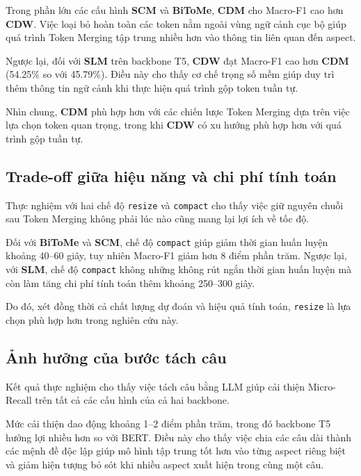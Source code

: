 Trong phần lớn các cấu hình \textbf{SCM} và \textbf{BiToMe},
\textbf{CDM} cho Macro-F1 cao hơn \textbf{CDW}.
Việc loại bỏ hoàn toàn các token nằm ngoài vùng ngữ cảnh cục bộ giúp
quá trình Token Merging tập trung nhiều hơn vào thông tin liên quan đến
aspect.

Ngược lại, đối với \textbf{SLM} trên backbone T5, \textbf{CDW} đạt
Macro-F1 cao hơn \textbf{CDM} (54.25\% so với 45.79\%).
Điều này cho thấy cơ chế trọng số mềm giúp duy trì thêm thông tin ngữ
cảnh khi thực hiện quá trình gộp token tuần tự.

Nhìn chung, \textbf{CDM} phù hợp hơn với các chiến lược Token Merging dựa trên
việc lựa chọn token quan trọng, trong khi \textbf{CDW} có xu hướng phù hợp hơn
với quá trình gộp tuần tự.

\subsection{Trade-off giữa hiệu năng và chi phí tính toán}

Thực nghiệm với hai chế độ \texttt{resize} và \texttt{compact} cho thấy việc giữ nguyên
chuỗi sau Token Merging không phải lúc nào cũng mang lại lợi ích về tốc
độ.

Đối với \textbf{BiToMe} và \textbf{SCM}, chế độ
\texttt{compact} giúp giảm thời gian huấn luyện khoảng 40--60 giây, tuy nhiên
Macro-F1 giảm hơn 8 điểm phần trăm.
Ngược lại, với \textbf{SLM}, chế độ \texttt{compact} không những
không rút ngắn thời gian huấn luyện mà còn làm tăng chi phí tính toán
thêm khoảng 250--300 giây.

Do đó, xét đồng thời cả chất lượng dự đoán và hiệu quả tính toán,
\texttt{resize} là lựa chọn phù hợp hơn trong nghiên cứu này.

\subsection{Ảnh hưởng của bước tách câu}

Kết quả thực nghiệm cho thấy việc tách câu bằng LLM giúp cải thiện
Micro-Recall trên tất cả các cấu hình của cả hai backbone.

Mức cải thiện dao động khoảng 1--2 điểm phần trăm, trong đó backbone
T5 hưởng lợi nhiều hơn so với BERT.
Điều này cho thấy việc chia các câu dài thành các mệnh đề độc lập giúp
mô hình tập trung tốt hơn vào từng aspect riêng biệt và giảm hiện tượng
bỏ sót khi nhiều aspect xuất hiện trong cùng một câu.

